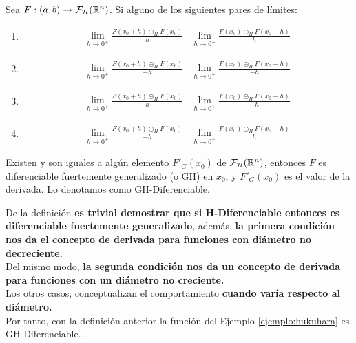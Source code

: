\begin{definicion}
	Sea $F: (a, b) \rightarrow \mathcal{F}_\mathcal{H}(\mathbb R^n)$. Si alguno de los siguientes pares de límites:
	
	\begin{enumerate}
		\item 	
		\[
		\begin{array}{c||c}
		\lim\limits_{h \rightarrow 0^+} \frac{F(x_0 + h) \circleddash_H F(x_0)}{h} & \lim\limits_{h \rightarrow 0^+} \frac{F(x_0) \circleddash_H F(x_0 - h)}{h}
		\end{array}
		\]
		\item 	
		\[
		\begin{array}{c||c}
		\lim\limits_{h \rightarrow 0^+} \frac{F(x_0 + h) \circleddash_H F(x_0)}{-h} & \lim\limits_{h \rightarrow 0^+} \frac{F(x_0) \circleddash_H F(x_0 - h)}{-h}
		\end{array}
		\]
		\item 	
		\[
		\begin{array}{c||c}
		\lim\limits_{h \rightarrow 0^+} \frac{F(x_0 + h) \circleddash_H F(x_0)}{h} & \lim\limits_{h \rightarrow 0^+} \frac{F(x_0) \circleddash_H F(x_0 - h)}{-h}
		\end{array}
		\]
		\item 	
		\[
		\begin{array}{c||c}
		\lim\limits_{h \rightarrow 0^+} \frac{F(x_0 + h) \circleddash_H F(x_0)}{-h} & \lim\limits_{h \rightarrow 0^+} \frac{F(x_0) \circleddash_H F(x_0 - h)}{h}
		\end{array}
		\]
	\end{enumerate}
	Existen y son iguales a algún elemento $F'_G(x_0)$ de $\mathcal{F}_\mathcal{H}(\mathbb R^n)$, entonces $F$ es diferenciable fuertemente generalizado (o GH) en $x_0$, y $F'_G(x_0)$ es el valor de la derivada. Lo denotamos como GH-Diferenciable.
\end{definicion}
De la definición \textbf{es trivial demostrar que si H-Diferenciable entonces es diferenciable fuertemente generalizado}, además, \textbf{la primera condición nos da el concepto de derivada para funciones con diámetro no decreciente.} \\
Del mismo modo, \textbf{la segunda condición nos da un concepto de derivada para funciones con un diámetro no creciente.} \\
Los otros casos, conceptualizan el comportamiento \textbf{cuando varía respecto al diámetro.} \\
Por tanto, con la definición anterior la función del Ejemplo \ref{ejemplo:hukuhara} es GH Diferenciable. 
